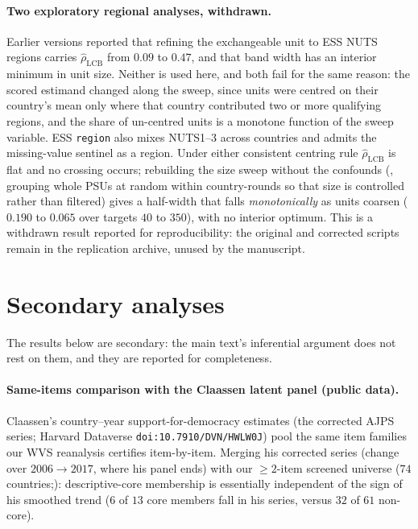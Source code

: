 \documentclass[12pt]{article}
\theoremstyle{definition}
\theoremstyle{remark}
\newcommand{\rhohat}{\widehat{\rho}}
\begin{document}
\paragraph{Two exploratory regional analyses, withdrawn.} Earlier versions
reported that refining the exchangeable unit to ESS NUTS regions carries
$\rhohat_{\mathrm{LCB}}$ from $0.09$ to $0.47$, and that band width has an
interior minimum in unit size. Neither is used here, and both fail for the
same reason: the scored estimand changed along the sweep, since units were
centred on their country's mean only where that country contributed two or
more qualifying regions, and the share of un-centred units is a monotone
function of the sweep variable. ESS \texttt{region} also mixes NUTS1--3
across countries and admits the missing-value sentinel as a region. Under
either consistent centring rule $\rhohat_{\mathrm{LCB}}$ is flat and no
crossing occurs; rebuilding the size sweep without the confounds
(, grouping whole PSUs at random within country-rounds so that
size is controlled rather than filtered) gives a half-width that falls
\emph{monotonically} as units coarsen ($0.190$ to $0.065$ over targets $40$
to $350$), with no interior optimum. This is a withdrawn result reported for
reproducibility: the original and corrected scripts remain in the
replication archive, unused by the manuscript.


\section{Secondary analyses}\label{sup:secondary}

The results below are secondary: the main text's inferential argument does
not rest on them, and they are reported for completeness.

\paragraph{Same-items comparison with the Claassen latent panel (public data).}
Claassen's country--year support-for-democracy estimates (the corrected AJPS
series; Harvard Dataverse \texttt{doi:10.7910/DVN/HWLW0J}) pool the same item
families our WVS reanalysis certifies item-by-item. Merging his corrected
series (change over $2006\to2017$, where his panel ends) with our $\ge2$-item
screened universe ($74$ countries;): descriptive-core membership is
essentially independent of the sign of his smoothed trend ($6$ of $13$ core
members fall in his series, versus $32$ of $61$ non-core).
\end{document}
